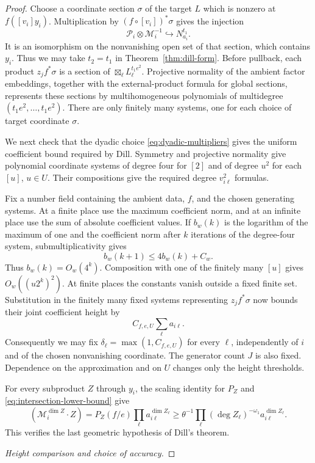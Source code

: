 \begin{proof}
Choose a coordinate section $\sigma$ of the target $L$ which is
nonzero at $f([v_i]y_i)$.  Multiplication by
$(f\circ[v_i])^*\sigma$ gives the injection
\[
 \mathcal P_i\otimes\mathcal M_i^{-1}
       \hookrightarrow N_{a_i}^{t_1}.
\]
It is an isomorphism on the nonvanishing open set of that section,
which contains $y_i$.  Thus we may take $t_2=t_1$ in
Theorem~\ref{thm:dill-form}.  Before pullback, each product
$z_jf^*\sigma$ is a section of
$\boxtimes_\ell L_\ell^{t_1e^2}$.
Projective normality of the ambient factor embeddings, together with
the external-product formula for global sections, represents these
sections by multihomogeneous polynomials of multidegree
$(t_1e^2,\ldots,t_1e^2)$.  There are only finitely many systems, one
for each choice of target coordinate $\sigma$.

We next check that the dyadic choice \eqref{eq:dyadic-multipliers}
gives the uniform coefficient bound required by Dill.
Symmetry and projective normality give polynomial coordinate systems
of degree four for $[2]$ and of degree $u^2$ for each $[u]$, $u\in U$.
Their compositions give the required degree $v_{i\ell}^2$ formulas.

Fix a number field containing the ambient data, $f$, and the chosen
generating systems.  At a finite
place use the maximum coefficient norm, and at an infinite place use
the sum of absolute coefficient values.  If $b_w(k)$ is the logarithm
of the maximum of one and the coefficient norm after $k$ iterations
of the degree-four system, submultiplicativity gives
\[
 b_w(k+1)\le4b_w(k)+C_w.
\]
Thus $b_w(k)=O_w(4^k)$.  Composition with one of the finitely many
$[u]$ gives $O_w((u2^k)^2)$.  At finite places the constants vanish
outside a fixed finite set.  Substitution in the finitely many fixed
systems representing $z_jf^*\sigma$ now bounds their joint
coefficient height by
\[
 C_{f,e,U}\sum_\ell a_{i\ell}.
\]
Consequently we may fix $\delta_\ell=\max(1,C_{f,e,U})$ for every
$\ell$, independently of $i$ and of the chosen nonvanishing coordinate.
The generator count $J$ is also fixed.  Dependence on the approximation
and on $U$ changes only the height thresholds.

For every subproduct $Z$ through $y_i$, the scaling identity for $P_Z$
and \eqref{eq:intersection-lower-bound} give
\[
 (\mathcal M_i^{\dim Z}\cdot Z)
  =P_Z(f/e)\prod_\ell a_{i\ell}^{\dim Z_\ell}
  \ge\theta^{-1}\prod_\ell
       (\deg Z_\ell)^{-\omega_1}a_{i\ell}^{\dim Z_\ell}.
\]
This verifies the last geometric hypothesis of Dill's theorem.

\medskip\noindent
\emph{Height comparison and choice of accuracy.}


\end{proof}
